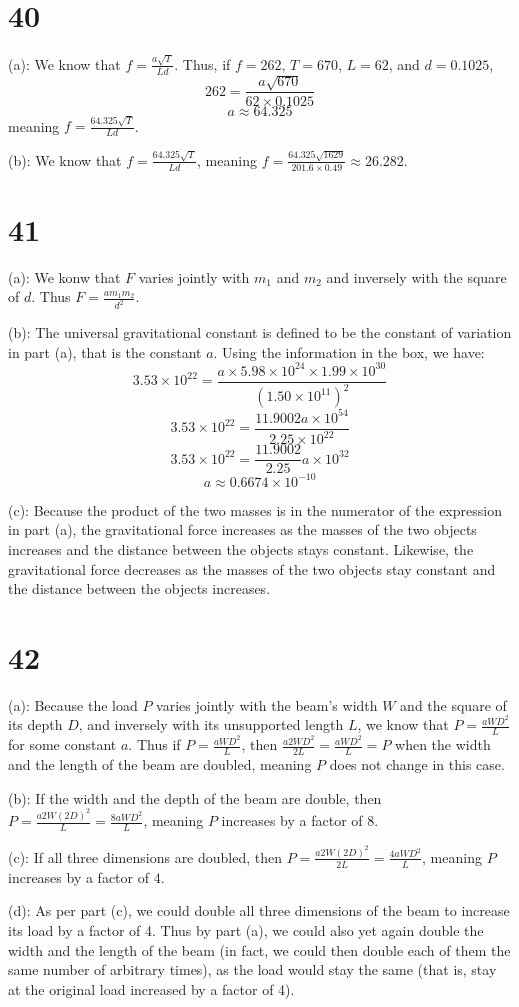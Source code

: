 \documentclass{article}
\theoremstyle{definition}
\newcommand{\?}{\stackrel{?}{=}}
\begin{document}
\section*{40}
(a): We know that $f=\frac{a\sqrt{T}}{Ld}$. Thus, if $f=262$, $T=670$, $L=62$, and $d=0.1025$, \[ 262=\frac{a\sqrt{670}}{62\times 0.1025} \]
\[ a\approx 64.325 \] meaning $f=\frac{64.325\sqrt{T}}{Ld}$.


(b): We know that $f=\frac{64.325\sqrt{T}}{Ld}$, meaning $f=\frac{64.325\sqrt{1629}}{201.6\times 0.49}\approx 26.282$.

\section*{41}
(a): We konw that $F$ varies jointly with $m_1$ and $m_2$ and inversely with the square of $d$. Thus $F=\frac{am_1m_2}{d^2}$.


(b): The universal gravitational constant is defined to be the constant of variation in part (a), that is the constant $a$. Using the information in the box, we have:
\[ 3.53\times 10^{22}=\frac{a\times 5.98\times 10^{24}\times 1.99\times 10^{30}}{(1.50\times 10^{11})^2} \]
\[ 3.53\times 10^{22}=\frac{11.9002a\times 10^{54}}{2.25\times 10^{22}} \]
\[ 3.53\times 10^{22}=\frac{11.9002}{2.25}a\times 10^{32} \]
\[ a\approx 0.6674\times 10^{-10} \]


(c): Because the product of the two masses is in the numerator of the expression in part (a), the gravitational force increases as the masses of the two objects increases and the 
distance between the objects stays constant. Likewise, the gravitational force decreases as the masses of the two objects stay constant and the distance between the objects increases.

\section*{42}
(a): Because the load $P$ varies jointly with the beam's width $W$ and the square of its depth $D$, and inversely with its unsupported length $L$, we know that 
$P=\frac{aWD^2}{L}$ for some constant $a$. Thus if $P=\frac{aWD^2}{L}$, then $\frac{a2WD^2}{2L}=\frac{aWD^2}{L}=P$ when the width and the length of the beam are doubled, meaning $P$ 
does not change in this case.


(b): If the width and the depth of the beam are double, then $P=\frac{a2W(2D)^2}{L}=\frac{8aWD^2}{L}$, meaning $P$ increases by a factor of $8$.


(c): If all three dimensions are doubled, then $P=\frac{a2W(2D)^2}{2L}=\frac{4aWD^2}{L}$, meaning $P$ increases by a factor of $4$.


(d): As per part (c), we could double all three dimensions of the beam to increase its load by a factor of 4. Thus by part (a), we could also
yet again double the width and the length of the beam (in fact, we could then double each of them the same number of arbitrary times), 
as the load would stay the same (that is, stay at the original load increased by a factor of 4).
\end{document}
